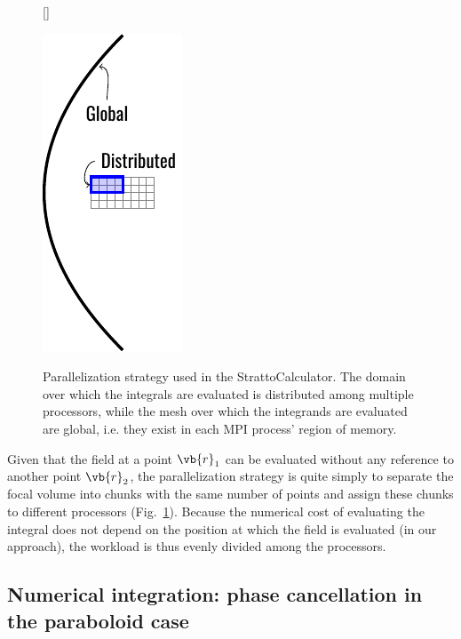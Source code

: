 \documentclass[11pt,SymmetricalJury]{inrsthesis/inrsthesis}
\begin{document}
\begin{figure}
  \centering
  [\FBwidth]
  {\hspace{3cm}\captionsetup{width=0.4\textwidth}
  \caption[Domain decomposition strategy employed in the StrattoCalculator.]
          {Parallelization strategy used in the StrattoCalculator. The domain
          over which the integrals are evaluated is distributed among multiple
          processors, while the mesh over which the integrands are evaluated are
          global, i.e. they exist in each MPI process' region of memory.}
          \label{fig:sc.domain-decomposition}
  }
  {\includegraphics{figs/hpc-domaindecomposition.pdf}}
\end{figure}

Given that the field at a point $\vb{r}_1$ can be evaluated without any
reference to another point $\vb{r}_2$, the parallelization strategy is quite
simply to separate the focal volume into chunks with the same number of points
and assign these chunks to different processors
(Fig.~\ref{fig:sc.domain-decomposition}). Because the numerical cost of
evaluating the integral does not depend on the position at which the field is
evaluated (in our approach), the workload is thus evenly divided among the
processors.

\subsection{Numerical integration: phase cancellation in the paraboloid case}
\label{sec:sc.phase-cancellation}
\end{document}
